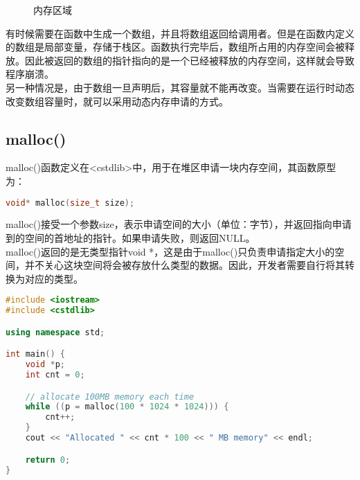 \begin{figure}[H]
    \centering
    \caption{内存区域}
\end{figure}

有时候需要在函数中生成一个数组，并且将数组返回给调用者。但是在函数内定义的数组是局部变量，存储于栈区。函数执行完毕后，数组所占用的内存空间会被释放。因此被返回的数组的指针指向的是一个已经被释放的内存空间，这样就会导致程序崩溃。\\

另一种情况是，由于数组一旦声明后，其容量就不能再改变。当需要在运行时动态改变数组容量时，就可以采用动态内存申请的方式。\\

\subsection{malloc()}

malloc()函数定义在<cstdlib>中，用于在堆区申请一块内存空间，其函数原型为：

\vspace{-0.5cm}

\begin{lstlisting}[language=C++]
void* malloc(size_t size);
\end{lstlisting}

malloc()接受一个参数size，表示申请空间的大小（单位：字节），并返回指向申请到的空间的首地址的指针。如果申请失败，则返回NULL。\\

malloc()返回的是无类型指针void *，这是由于malloc()只负责申请指定大小的空间，并不关心这块空间将会被存放什么类型的数据。因此，开发者需要自行将其转换为对应的类型。\\


\begin{lstlisting}[language=C++]
#include <iostream>
#include <cstdlib>

using namespace std;

int main() {
    void *p;
    int cnt = 0;

    // allocate 100MB memory each time
    while ((p = malloc(100 * 1024 * 1024))) {
        cnt++;
    }
    cout << "Allocated " << cnt * 100 << " MB memory" << endl;

    return 0;
}
\end{lstlisting}

